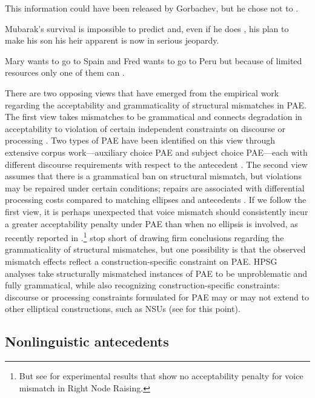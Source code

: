 \eal

\ex This information could have been released by Gorbachev, but he chose not to \jbtr. \citep[37]{Hardt1993} \label{27}

\ex Mubarak's survival is impossible to predict and, even if he does \jbtr, his plan to make his son his heir apparent is now in serious jeopardy. \citep[7]{Miller2014a} \label{28}

\ex Mary wants to go to Spain and Fred wants to go to Peru but because of limited resources only one of them can \jbtr. \citep[128]{Webber79a} \label{29}
\zl

There are two opposing views that have emerged from the empirical work regarding the acceptability and grammaticality of structural mismatches in PAE. The first view takes mismatches to be grammatical and connects degradation in acceptability to violation of certain independent constraints on discourse \citep{Kehler2002, Miller2011, %
Miller2014, Miller2014a, Miller2014b} or processing \citep{Kim2011}. Two types of PAE have been identified on this view through extensive corpus work---auxiliary choice PAE and subject choice PAE---each with different discourse requirements with respect to the antecedent \citep{Miller2011, Miller2014a, Miller2014b}. The second view assumes that there is a grammatical ban on structural mismatch, but violations may be repaired under certain conditions; repairs are associated with differential processing costs compared to matching ellipses and antecedents \citep{Arregui2006, Grant2012}. If we follow the first view, it is perhaps unexpected that voice mismatch should consistently incur a greater acceptability penalty under PAE than when no ellipsis is involved, as recently reported in \citet{Kim2018}.\footnote{But see \citet{Abeille2016} for experimental results
that show no acceptability penalty for voice mismatch in  Right Node Raising.} \citet{Kim2018} stop short of drawing firm conclusions regarding the grammaticality of structural mismatches, but one possibility is that the observed mismatch effects reflect a construction-specific constraint on PAE. HPSG analyses take structurally mismatched instances of PAE to be unproblematic and fully grammatical, while also recognizing construction-specific constraints: discourse or processing constraints formulated for PAE may or may not extend to other elliptical constructions, such as NSUs (see \citealt{Abeille2016,Ginzburg2018} for this point).


\subsection{Nonlinguistic antecedents}
\label{sec-nonlinguistic-antecedents}

